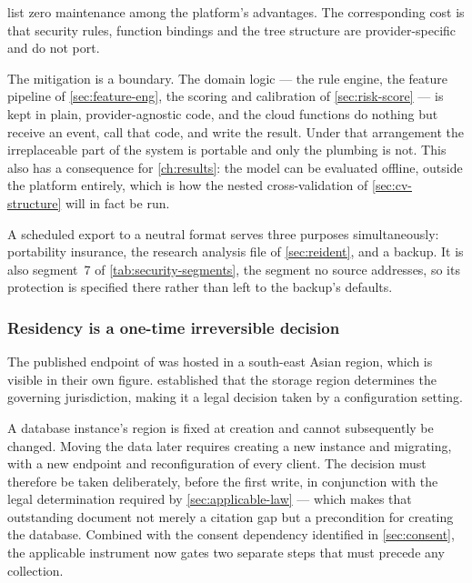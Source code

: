\documentclass[12pt,a4paper,oneside]{report}
\begin{document}
\Textcite{efendi2025} list zero maintenance among the platform's advantages. The corresponding cost is that security rules, function bindings and the tree structure are provider-specific and do not port.

The mitigation is a boundary. The domain logic --- the rule engine, the feature pipeline of \cref{sec:feature-eng}, the scoring and calibration of \cref{sec:risk-score} --- is kept in plain, provider-agnostic code, and the cloud functions do nothing but receive an event, call that code, and write the result. Under that arrangement the irreplaceable part of the system is portable and only the plumbing is not. This also has a consequence for \cref{ch:results}: the model can be evaluated offline, outside the platform entirely, which is how the nested cross-validation of \cref{sec:cv-structure} will in fact be run.

A scheduled export to a neutral format serves three purposes simultaneously: portability insurance, the research analysis file of \cref{sec:reident}, and a backup. It is also segment~7 of \cref{tab:security-segments}, the segment no source addresses, so its protection is specified there rather than left to the backup's defaults.

\subsubsection{Residency is a one-time irreversible decision}\label{sec:residency-irreversible}

The published endpoint of \textcite{efendi2025} was hosted in a south-east Asian region, which is visible in their own figure.  established that the storage region determines the governing jurisdiction, making it a legal decision taken by a configuration setting.

A database instance's region is fixed at creation and cannot subsequently be changed. Moving the data later requires creating a new instance and migrating, with a new endpoint and reconfiguration of every client. The decision must therefore be taken deliberately, before the first write, in conjunction with the legal determination required by \cref{sec:applicable-law} --- which makes that outstanding document not merely a citation gap but a precondition for creating the database. Combined with the consent dependency identified in \cref{sec:consent}, the applicable instrument now gates two separate steps that must precede any collection.

\end{document}
